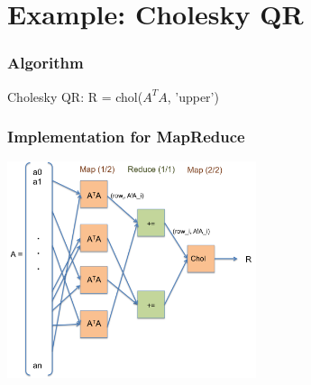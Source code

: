 \documentclass{beamer}
\begin{document}
\section{Example: Cholesky QR}

\begin{frame}
\frametitle{Algorithm}

Cholesky QR: R = chol($A^TA$, 'upper')

\end{frame}
















\begin{frame}
\frametitle{Implementation for MapReduce}

\begin{center}
\includegraphics[height=2.5in]{./images/mrcqr.png}
\end{center}

\end{frame}
\end{document}
